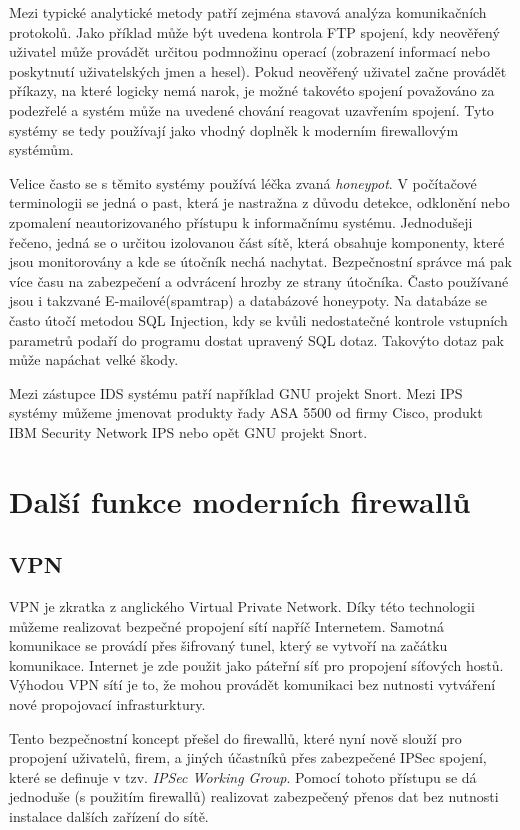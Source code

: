 \documentclass[11pt,a4paper]{article}
\begin{document}
Mezi typické analytické metody patří zejména stavová analýza komunikačních protokolů. Jako příklad může být uvedena kontrola FTP spojení, kdy neověřený uživatel může provádět určitou podmnožinu operací (zobrazení informací nebo poskytnutí uživatelských jmen a hesel). Pokud neověřený uživatel začne provádět příkazy, na které logicky nemá narok, je možné takovéto spojení považováno za podezřelé a systém může na uvedené chování reagovat uzavřením spojení. Tyto systémy se tedy používají jako vhodný doplněk k moderním firewallovým systémům.

Velice často se s těmito systémy používá léčka zvaná \textit{honeypot}. V počítačové terminologii se jedná o past, která je nastražna z důvodu detekce, odklonění nebo zpomalení neautorizovaného přístupu k informačnímu systému. Jednodušeji řečeno, jedná se o určitou izolovanou část sítě, která obsahuje komponenty, které jsou monitorovány a kde se útočník nechá nachytat. Bezpečnostní správce má pak více času na zabezpečení a odvrácení hrozby ze strany útočníka. Často používané jsou i takzvané E-mailové(spamtrap) a databázové honeypoty. Na databáze se často útočí metodou SQL Injection, kdy se kvůli nedostatečné kontrole vstupních parametrů podaří do programu dostat upravený SQL dotaz. Takovýto dotaz pak může napáchat velké škody. 

Mezi zástupce IDS systému patří například GNU projekt Snort. Mezi IPS systémy můžeme jmenovat produkty řady ASA 5500 od firmy Cisco, produkt IBM Security Network IPS nebo opět GNU projekt Snort. 

\section{Další funkce moderních firewallů}
\subsection{VPN}
VPN je zkratka z anglického Virtual Private Network. Díky této technologii můžeme realizovat bezpečné propojení sítí napříč Internetem. Samotná komunikace se provádí přes šifrovaný tunel, který se vytvoří na začátku komunikace. Internet je zde použit jako páteřní síť pro propojení síťových hostů. Výhodou VPN sítí je to, že mohou provádět komunikaci bez nutnosti vytváření nové propojovací infrasturktury.

Tento bezpečnostní koncept přešel do firewallů, které nyní nově slouží pro propojení uživatelů, firem, a jiných účastníků přes zabezpečené IPSec spojení, které se definuje v tzv. \textit{IPSec Working Group}. Pomocí tohoto přístupu se dá jednoduše (s použitím firewallů) realizovat zabezpečený přenos dat bez nutnosti instalace dalších zařízení do sítě.
\end{document}
